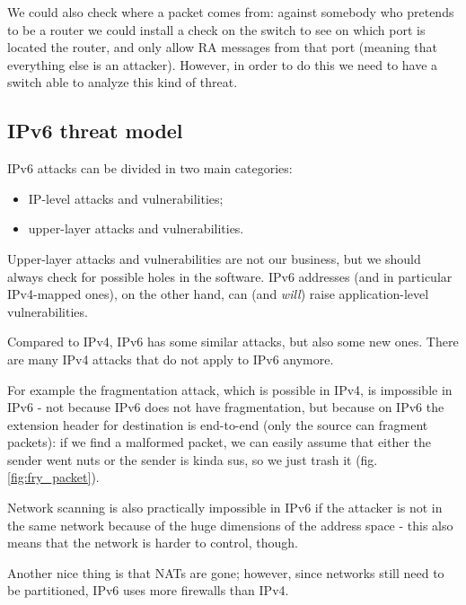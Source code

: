 We could also check where a packet comes from: against somebody who pretends to be a router we could install a check on the switch to see on which port is located the router, and only allow RA messages from that port (meaning that everything else is an attacker). However, in order to do this we need to have a switch able to analyze this kind of threat.


\subsection{IPv6 threat model}
IPv6 attacks can be divided in two main categories:
\begin{itemize}
	\item IP-level attacks and vulnerabilities;
	\item upper-layer attacks and vulnerabilities.
\end{itemize}

Upper-layer attacks and vulnerabilities are not our business, but we should always check for possible holes in the software. IPv6 addresses (and in particular IPv4-mapped ones), on the other hand, can (and \textit{will}) raise application-level vulnerabilities.

Compared to IPv4, IPv6 has some similar attacks, but also some new ones. There are many IPv4 attacks that do not apply to IPv6 anymore.

For example the fragmentation attack, which is possible in IPv4, is impossible in IPv6 - not because IPv6 does not have fragmentation, but because on IPv6 the extension header for destination is end-to-end (only the source can fragment packets): if we find a malformed packet, we can easily assume that either the sender went nuts or the sender is kinda sus, so we just trash it (fig. \ref{fig:fry_packet}).

Network scanning is also practically impossible in IPv6 if the attacker is not in the same network because of the huge dimensions of the address space - this also means that the network is harder to control, though.

Another nice thing is that NATs are gone; however, since networks still need to be partitioned, IPv6 uses more firewalls than IPv4.


